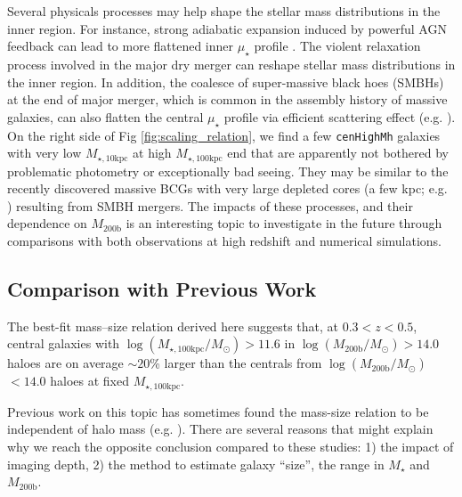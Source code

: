 \documentclass[a4paper,fleqn,usenatbib]{mnras}
\def\rbcg{\texttt{cenHighMh}}
\def\mstar{{$M_{\star}$}}
\def\mhalo{{$M_{\mathrm{200b}}$}}
\def\logmhalo{{$\log (M_{\mathrm{200b}}/M_{\odot})$}}
\def\minn{{$M_{\star,10\mathrm{kpc}}$}}
\def\mtot{{$M_{\star,100\mathrm{kpc}}$}}
\def\logmtot{{$\log (M_{\star,100\mathrm{kpc}}/M_{\odot})$}}
\def\mden{{$\mu_{\star}$}}
\begin{document}
    Several physicals processes may help shape the stellar mass distributions in the 
    inner region. 
    For instance, strong adiabatic expansion induced by powerful AGN feedback can 
    lead to more flattened inner \mden{} profile \citealt{Fan2008}. 
    The violent relaxation process involved in the major dry merger can reshape 
    stellar mass distributions in the inner region. 
    In addition, the coalesce of super-massive black hoes (SMBHs) at the end of 
    major merger, which is common in the assembly history of massive galaxies, can 
    also flatten the central \mden{} profile via efficient scattering effect 
    (e.g. \citealt{Milosavljevi2002}).
    On the right side of Fig \ref{fig:scaling_relation}, we find a few \rbcg{} 
    galaxies with very low \minn{} at high \mtot{} end that are apparently not bothered 
    by problematic photometry or exceptionally bad seeing.  
    They may be similar to the recently discovered massive BCGs with very large 
    depleted cores (a few kpc; e.g. \citealt{Postman2012, LopezCruz2014, Thomas2016,
    Bonfini2016}) resulting from SMBH mergers.
    The impacts of these processes, and their dependence on \mhalo{} is an interesting 
    topic to investigate in the future through comparisons with both observations 
    at high redshift and numerical simulations. 


\subsection{Comparison with Previous Work}

    The best-fit mass--size relation derived here suggests that, at $0.3 < z < 0.5$, 
    central galaxies with \logmtot{}$>11.6$ in \logmhalo{}$>14.0$ haloes are on average
    $\sim20$\% larger than the centrals from \logmhalo{}$<14.0$ haloes at fixed \mtot{}.
    
    Previous work on this topic has sometimes found the mass-size relation to be 
    independent of halo mass (e.g. \citealt{Nair2010, Maltby2010, Cappellari2013, 
    HCompany13}). 
    There are several reasons that might explain why we reach the opposite conclusion 
    compared to these studies: 1) the impact of imaging depth, 2) the method to estimate 
    galaxy ``size'',  the range in  \mstar{} and \mhalo{}. 
      
\end{document}
